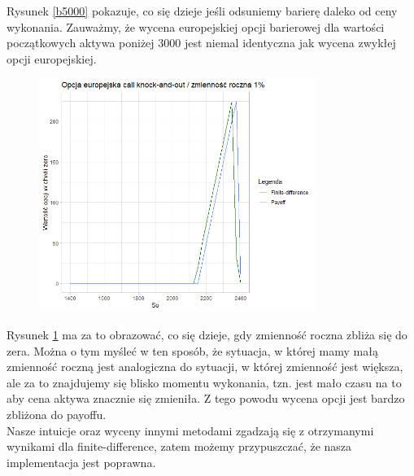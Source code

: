 \documentclass[12pt]{article}
\begin{document}
Rysunek \ref{b5000} pokazuje, co się dzieje jeśli odsuniemy barierę daleko od ceny wykonania. Zauważmy, że wycena europejskiej opcji barierowej dla wartości początkowych aktywa poniżej \(3000\) jest niemal identyczna jak wycena zwykłej opcji europejskiej.\\

\begin{figure}[H]
    \centering
    \includegraphics[width=0.8\textwidth,height=\textheight,keepaspectratio]{ec_sigma0.png}
    \caption{}
    \label{sigma0}
\end{figure}

Rysunek \ref{sigma0} ma za to obrazować, co się dzieje, gdy zmienność roczna zbliża się do zera. Można o tym myśleć w ten sposób, że sytuacja, w której mamy małą zmienność roczną jest analogiczna do sytuacji, w której zmienność jest większa, ale za to znajdujemy się blisko momentu wykonania, tzn. jest mało czasu na to aby cena aktywa znacznie się zmieniła. Z tego powodu wycena opcji jest bardzo zbliżona do payoffu.\\

Nasze intuicje oraz wyceny innymi metodami zgadzają się z otrzymanymi wynikami dla finite-difference, zatem możemy przypuszczać, że nasza implementacja jest poprawna.
\end{document}
